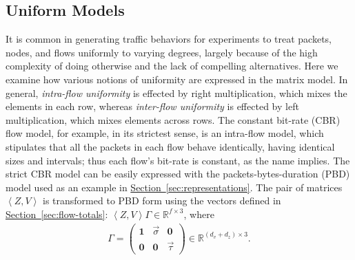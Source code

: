 \documentclass[conference]{IEEEtran}
\newcommand{\caps}[1]{{\small{#1}}}
\newcommand{\Section}[1]{\hyperref[sec:#1]{Section~\ref*{sec:#1}}}
\newcommand{\R}{\mathbb{R}}
\newcommand{\ones}[1]{\mathbf{1}_{#1}}
\newcommand{\zeros}[1]{\mathbf{0}_{#1}}
\newcommand{\seq}[1]{\left<#1\right>}
\begin{document}

\subsection{Uniform Models}

It is common in generating traffic behaviors for experiments to treat packets, nodes, and flows uniformly to varying degrees, largely because of the high complexity of doing otherwise and the lack of compelling alternatives. Here we examine how various notions of uniformity are expressed in the matrix model. In general, \textit{intra-flow uniformity} is effected by right multiplication, which mixes the elements in each row, whereas \textit{inter-flow uniformity} is effected by left multiplication, which mixes elements across rows. The constant bit-rate (\caps{CBR}) flow model, for example, in its strictest sense, is an intra-flow model, which stipulates that all the packets in each flow behave identically, having identical sizes and intervals; thus each flow's bit-rate is constant, as the name implies. The strict \caps{CBR} model can be easily expressed with the packets-bytes-duration (\caps{PBD}) model used as an example in \Section{representations}. The pair of matrices $\seq{Z,V}$ is transformed to \caps{PBD} form using the vectors defined in \Section{flow-totals}: $\seq{Z,V}\Gamma\in\R^{f \times 3}$, where
\begin{align}
\Gamma=\begin{pmatrix}
\ones{} & \vec{\sigma} & \zeros{} \\
\zeros{} & \zeros{} & \vec{\tau}
\end{pmatrix} \in \R^{(d_v+d_z)\times{3}}.
\end{align}

\end{document}
